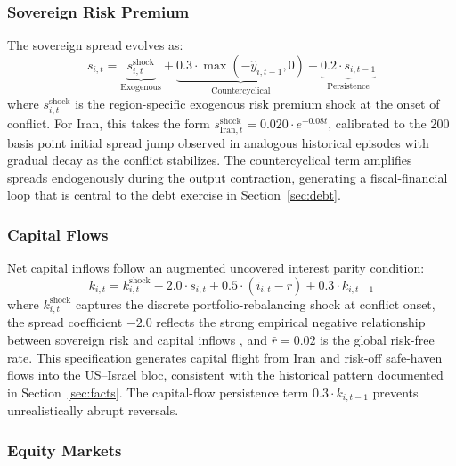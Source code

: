 \documentclass[12pt]{article}
\begin{document}
\subsubsection{Sovereign Risk Premium}

The sovereign spread evolves as:
\begin{equation}
s_{i,t} = \underbrace{s^{\text{shock}}_{i,t}}_{\text{Exogenous}} + \underbrace{0.3 \cdot \max(-\hat{y}_{i,t-1}, 0)}_{\text{Countercyclical}} + \underbrace{0.2 \cdot s_{i,t-1}}_{\text{Persistence}}
\label{eq:spread}
\end{equation}
where $s^{\text{shock}}_{i,t}$ is the region-specific exogenous risk premium shock at the onset of conflict. For Iran, this takes the form $s^{\text{shock}}_{\text{Iran},t} = 0.020 \cdot e^{-0.08t}$, calibrated to the 200 basis point initial spread jump observed in analogous historical episodes with gradual decay as the conflict stabilizes. The countercyclical term amplifies spreads endogenously during the output contraction, generating a fiscal-financial loop that is central to the debt exercise in Section~\ref{sec:debt}.

\subsubsection{Capital Flows}

Net capital inflows follow an augmented uncovered interest parity condition:
\begin{equation}
k_{i,t} = k^{\text{shock}}_{i,t} - 2.0 \cdot s_{i,t} + 0.5 \cdot (i_{i,t} - \bar{r}) + 0.3 \cdot k_{i,t-1}
\label{eq:capital}
\end{equation}
where $k^{\text{shock}}_{i,t}$ captures the discrete portfolio-rebalancing shock at conflict onset, the spread coefficient $-2.0$ reflects the strong empirical negative relationship between sovereign risk and capital inflows \citep{longstaff2011financial}, and $\bar{r} = 0.02$ is the global risk-free rate. This specification generates capital flight from Iran and risk-off safe-haven flows into the US--Israel bloc, consistent with the historical pattern documented in Section~\ref{sec:facts}. The capital-flow persistence term $0.3 \cdot k_{i,t-1}$ prevents unrealistically abrupt reversals.

\subsubsection{Equity Markets}
\end{document}
